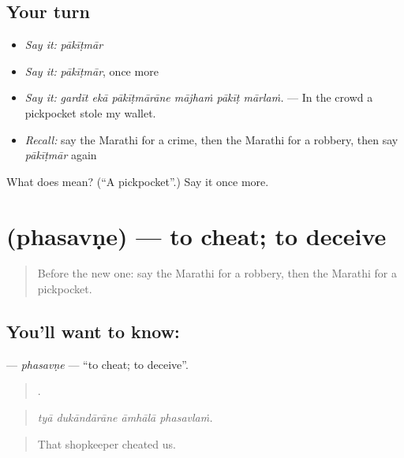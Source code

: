 \subsection*{Your turn}
\begin{itemize}
\raggedright
  \item \emph{Say it:} \emph{pākīṭmār}
  \item \emph{Say it:} \emph{pākīṭmār}, once more
  \item \emph{Say it:} \emph{gardīt ekā pākīṭmārāne mājhaṁ pākīṭ mārlaṁ.} — In the crowd a pickpocket stole my wallet.
  \item \emph{Recall:} say the Marathi for a crime, then the Marathi for a robbery, then say \emph{pākīṭmār} again
\end{itemize}

\begin{tcolorbox}[breakable,colback=teal!4,colframe=teal!35!black,title={Before you move on}]
What does  mean? (\textquotedblleft{}A pickpocket\textquotedblright{}.) Say it once more.
\end{tcolorbox}
\section[\texorpdfstring{\mr{फसवणे} (phasavṇe)}{फसवणे (phasavṇe)}]{ (phasavṇe) — to cheat; to deceive}

\label{lesson:MR-C289-phasavne}



\begin{quote}
Before the new one: say the Marathi for a robbery, then the Marathi for a pickpocket.
\end{quote}

\subsection*{You'll want to know: }
\textbf{} — \emph{phasavṇe} — \textquotedblleft{}to cheat; to deceive\textquotedblright{}.

\begin{quote}
   .
\end{quote}

\begin{quote}
\emph{tyā dukāndārāne āmhālā phasavlaṁ.}
\end{quote}

\begin{quote}
That shopkeeper cheated us.
\end{quote}

